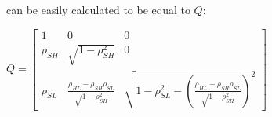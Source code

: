 can be easily calculated to be equal to $Q$:

\begin{center}
	$Q = \begin{bmatrix}
					1 & 0 & 0 \\
					\rho_{SH} & \sqrt{1-\rho^2_{SH}} & 0 \\
					\rho_{SL} & \frac{\rho_{HL} - \rho_{SH}\rho_{SL}}{\sqrt{1-\rho^2_{SH}}} & \sqrt{1-\rho^2_{SL}-(\frac{\rho_{HL} - \rho_{SH}\rho_{SL}}{\sqrt{1-\rho^2_{SH}}})^2}
			\end{bmatrix}
	$
\end{center}


